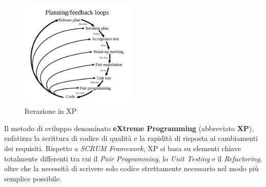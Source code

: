 \documentclass[a4paper,12pt]{report}
\begin{document}
				\begin{figure}[h]
					\centering
					\includegraphics[width=0.5\textwidth]{xp_plan}
					\caption{Iterazione in XP}
					\label{fig:xp_plan}
				\end{figure}
			
				Il metodo di sviluppo denominato \textbf{eXtreme Programming} (abbreviato \textbf{XP}), enfatizza la scrittura di codice di qualità e la rapidità di risposta ai cambiamenti dei requisiti. Rispetto a \emph{SCRUM Framework}, XP si basa su elementi chiave totalmente differenti tra cui il \emph{Pair Programming}, lo \emph{Unit Testing} e il \emph{Refactoring}, oltre che la necessità di scrivere solo codice strettamente necessario nel modo più semplice possibile.
				
\end{document}
